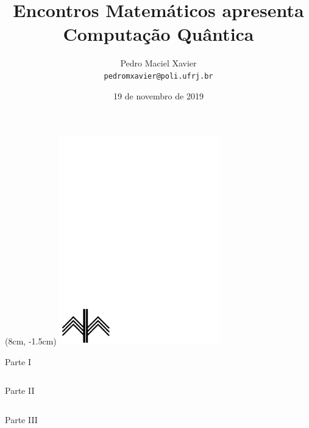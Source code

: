 \documentclass[t]{beamer}
\title{
	{{\Large \textbf{Encontros Matemáticos}} {\small 	apresenta}}\\
\vspace{30pt}
{\huge Computação Quântica}
}
\institute{IM-UFRJ}
\date{19 de novembro de 2019}
\author{Pedro Maciel Xavier \\ \texttt{pedromxavier@poli.ufrj.br}}
\begin{document}
	\begin{frame}
		\titlepage
		\begin{textblock*}{7cm}(8cm, -1.5cm)
			\includegraphics[width=7cm]{im.pdf}
		\end{textblock*}
	\end{frame}
	
	\begin{frame}{Parte I}
	\begin{columns}[t]
        \begin{column}{.5\textwidth}
            \tableofcontents[sections={1}]
        \end{column}
        \begin{column}{.5\textwidth}
            \tableofcontents[sections={2}]
        \end{column}
    \end{columns}
    \end{frame}

    \begin{frame}{Parte II}
    \begin{columns}[t]
        \begin{column}{.5\textwidth}
            \tableofcontents[sections={3}]
        \end{column}
        \begin{column}{.5\textwidth}
            \tableofcontents[sections={4-5}]
        \end{column}
    \end{columns}
	\end{frame}

    \begin{frame}{Parte III}
  		\tableofcontents[sections={6-}]
	\end{frame}
	
\end{document}
